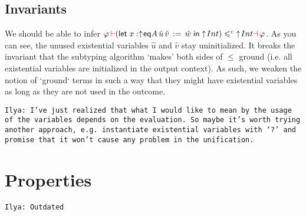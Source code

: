\documentclass[a4,natbib=false]{article}
\newcommand{\ilyam}[1]{{\color{red} \texttt{Ilya:  #1}}}
\newcommand{\letname}{\mathsf{let}}
\newcommand{\letval}[3]{\letname\; {#1} \,:=\, {#2} \;\mathsf{in}\; {#3}}
\newcommand{\comptoval}[1]{\downarrow \hspace{-2pt} #1}
\newcommand{\valtocomp}[1]{\uparrow \hspace{-2pt} #1}
\newcommand{\foralltype}[2]{\forall {#1}.\,#2}
\newcommand{\eqtype}[3]{\mathsf{eq}{#1}\,{#2}\,{#3}}
\newcommand{\return}[1]{\mathsf{return}\,{#1}}
\newcommand{\thunk}[1]{\{{#1}\}}
\newcommand{\subt}{\leqslant}
\newcommand{\csubt}{\leqslant^c}
\newcommand{\judgeacsubt}[4]{{#1}\,{\color{purple}\vdash} {#2} \csubt {#3} {\color{purple}\dashv}\,{#4}}
\begin{document}


\subsection{Invariants}

We should be able to infer
$\judgeacsubt{\varphi}{(\letval{x:\valtocomp{\eqtype{A}{\hat{u}}{\hat{v}}}}{\hat{w}}{\valtocomp{Int}})}{\valtocomp{Int}}{\varphi}$.
As you can see, the unused existential variables $\hat{u}$ and $\hat{v}$ stay uninitialized.
It breaks the invariant that the subtyping algorithm `makes' both sides of $\leqslant$ ground (i.e. all existential variables are initialized in the output context).
As such, we weaken the notion of `ground` terms in such a way that they might have existential variables as long as they are not used in the outcome.

\ilyam{I've just realized that what I would like to mean by the usage of the variables depends on the evaluation. So maybe it's worth trying another approach,
  e.g. instantiate existential variables with `?' and promise that it won't cause any problem in the unification. }


\section{Properties}
\ilyam{Outdated}

\end{document}
